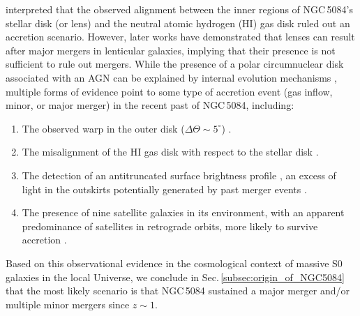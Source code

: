 \documentclass[modern]{CORE-AAS/aastex631}
\begin{document}
\citet{gottesman+1986mnras219_759} interpreted that the observed alignment between the inner regions of NGC\,5084's stellar disk (or lens) and the neutral atomic hydrogen (HI) gas disk ruled out an accretion scenario. However, later works \citep{elichemoral+2018aap617_113} have demonstrated that lenses can result after major mergers in lenticular galaxies, implying that their presence is not sufficient to rule out mergers. While the presence of a polar circumnuclear disk associated with an AGN can be explained by internal evolution mechanisms \citep[outflow gas cooling and subsequent precipitation onto the core,][]{combes2017inproceedings_Di}, multiple forms of evidence point to some type of accretion event (gas inflow, minor, or major merger) in the recent past of NGC\,5084, including:
\begin{enumerate}
\item The observed warp in the outer disk ($\Delta\Theta\sim5^{\circ}$) \citep{zeilinger+1990mnras246_324}.

\item The misalignment of the HI gas disk with respect to the stellar disk \citep{gottesman+1986mnras219_759,zheng+2022afz22_085004}.
\item The detection of an antitruncated surface brightness profile \citep{comeron+2012apj759_98}, an excess of light in the outskirts potentially generated by past merger events \citep{younger+2007apj670_269, borlaff+2014aap570_103}.

\item The presence of nine satellite galaxies in its environment, with an apparent predominance of satellites in retrograde orbits, more likely to survive accretion \citep[see Fig.\,\ref{fig:NGC5084_environment}]{carignan+1997aj113_1585}.

\end{enumerate}
Based on this observational evidence in the cosmological context of massive S0 galaxies in the local Universe, we conclude in Sec.\,\ref{subsec:origin_of_NGC5084} that the most likely scenario is that NGC\,5084 sustained a major merger and/or multiple minor mergers since $z\sim1$.
\end{document}
